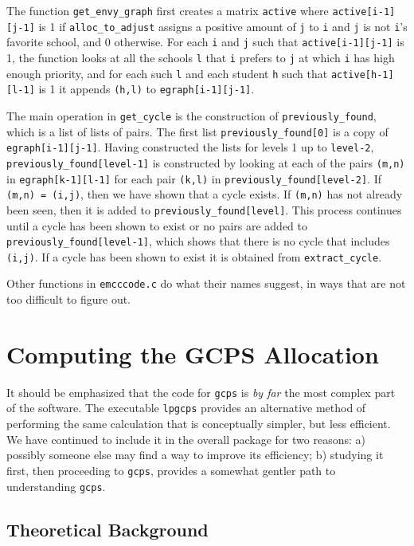 \documentclass[12pt]{article}
\theoremstyle{definition}
\begin{document}
\begin{appendix}
The function \texttt{get\_envy\_graph} first creates a matrix
\texttt{active} where \texttt{active[i-1][j-1]} is 1 if
\texttt{alloc\_to\_adjust} assigns a positive amount of \texttt{j} to
\texttt{i} and \texttt{j} is not \texttt{i}'s favorite school, and 0
otherwise.  For each \texttt{i} and \texttt{j} such that
\texttt{active[i-1][j-1]} is 1, the function looks at all the schools
\texttt{l} that \texttt{i} prefers to \texttt{j} at which \texttt{i} has 
high enough priority, and for each such \texttt{l} and each student
\texttt{h} such that \texttt{active[h-1][l-1]} is 1 it appends
\texttt{(h,l)} to \texttt{egraph[i-1][j-1]}.

The main operation in \texttt{get\_cycle} is the construction of
\texttt{previously\_found}, which is a list of lists of pairs.  The
first list \texttt{previously\_found[0]} is a copy of
\texttt{egraph[i-1][j-1]}.  Having constructed the lists for levels 1
up to \texttt{level-2}, \texttt{previously\_found[level-1]} is
constructed by looking at each of the pairs \texttt{(m,n)} in
\texttt{egraph[k-1][l-1]} for each pair \texttt{(k,l)} in
\texttt{previously\_found[level-2]}.  If \texttt{(m,n) = (i,j)}, then
we have shown that a cycle exists.  If \texttt{(m,n)} has not already
been seen, then it is added to \texttt{previously\_found[level]}.
This process continues until a cycle has been shown to exist or no
pairs are added to \texttt{previously\_found[level-1]}, which shows
that there is no cycle that includes \texttt{(i,j)}.  If a cycle has
been shown to exist it is obtained from \texttt{extract\_cycle}.

Other functions in \texttt{emcccode.c} do what their names suggest, in
ways that are not too difficult to figure out.

\section{Computing the GCPS Allocation}

It should be emphasized that the code for \texttt{gcps} is \emph{by
far} the most complex part of the software.  The executable
\texttt{lpgcps} provides an alternative method of performing the same
calculation that is conceptually simpler, but less efficient.  We have
continued to include it in the overall package for two reasons: a)
possibly someone else may find a way to improve its efficiency; b)
studying it first, then proceeding to \texttt{gcps}, provides a
somewhat gentler path to understanding \texttt{gcps}.

\subsection{Theoretical Background}


\end{appendix}
\end{document}

